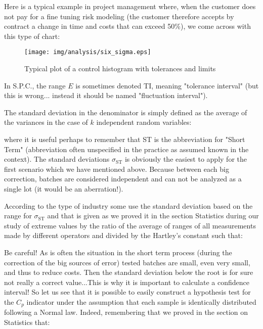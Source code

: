 \begin{enumerate}
		Here is a typical example in project management where, when the customer does not pay for a fine tuning risk modeling (the customer therefore accepts by contract a change in time and costs that can exceed 50\%), we come across with this type of chart:
		
		\begin{figure}[H]
		\centering
		\texttt{[image: img/analysis/six\_sigma.eps]}
		\caption{Typical plot of a control histogram with tolerances and limits}
		\end{figure}
		
		\begin{tcolorbox}[title=Remark,colframe=black,arc=10pt]
In S.P.C., the range $E$ is sometimes denoted TI, meaning "tolerance interval" (but this is wrong... instead it should be named "fluctuation interval").
		\end{tcolorbox}
		
		The standard deviation in the denominator is simply defined as the average of the variances in the case of $k$ independent random variables:
			
		where it is useful perhaps to remember that ST is the abbreviation for "Short Term" (abbreviation often unspecified in the practice as assumed known in the context). The standard deviations $\sigma_{\text{ST}}$ is obviously the easiest to apply for the first scenario which we have mentioned above. Because between each big correction, batches are considered independent and can not be analyzed as a single lot (it would be an aberration!).
		
		\begin{tcolorbox}[title=Remark,colframe=black,arc=10pt]
		According to the type of industry some use the standard deviation based on the range for $\sigma_{\text{ST}}$ and that is given as we proved it in the section Statistics during our study of extreme values by the ratio of the average of ranges of all measurements made by different operators and divided by the Hartley's constant such that:
		
		\end{tcolorbox}
		
		
		Be careful! As is often the situation in the short term process (during the correction of the big sources of error) tested batches are small, even very small, and thus to reduce costs. Then the standard deviation below the root is for sure not really a correct value...This is why it is important to calculate a confidence interval! So let us see that it is possible to easily construct a hypothesis test for the $C_p$ indicator under the assumption that each sample is identically distributed following a Normal law. Indeed, remembering that we proved in the section on Statistics that:
		

\end{enumerate}
